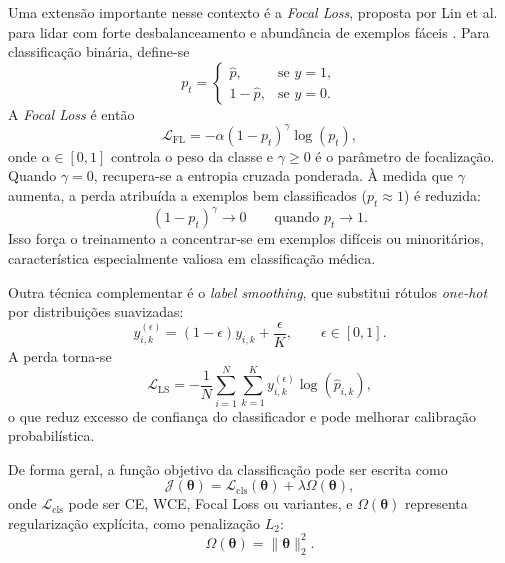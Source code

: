 \documentclass[tcc,capa]{texufpel}
\begin{document}
Uma extensão importante nesse contexto é a \textit{Focal Loss}, proposta por Lin et al. para lidar com forte desbalanceamento e abundância de exemplos fáceis \cite{Lin2017Focal}. Para classificação binária, define-se
\begin{equation}
	p_t =
	\begin{cases}
		\hat{p}, & \text{se } y=1,\\
		1-\hat{p}, & \text{se } y=0.
	\end{cases}
\end{equation}
A \textit{Focal Loss} é então
\begin{equation}
	\mathcal{L}_{\text{FL}}
	=
	-\alpha (1-p_t)^{\gamma}\log(p_t),
\end{equation}
onde \(\alpha \in [0,1]\) controla o peso da classe e \(\gamma \ge 0\) é o parâmetro de focalização. Quando \(\gamma=0\), recupera-se a entropia cruzada ponderada. À medida que \(\gamma\) aumenta, a perda atribuída a exemplos bem classificados (\(p_t \approx 1\)) é reduzida:
\begin{equation}
	(1-p_t)^{\gamma} \to 0
	\qquad \text{quando } p_t \to 1.
\end{equation}
Isso força o treinamento a concentrar-se em exemplos difíceis ou minoritários, característica especialmente valiosa em classificação médica.

Outra técnica complementar é o \textit{label smoothing}, que substitui rótulos \textit{one-hot} por distribuições suavizadas:
\begin{equation}
	y_{i,k}^{(\epsilon)}
	=
	(1-\epsilon)y_{i,k} + \frac{\epsilon}{K},
	\qquad \epsilon \in [0,1].
\end{equation}
A perda torna-se
\begin{equation}
	\mathcal{L}_{\text{LS}}
	=
	-\frac{1}{N}\sum_{i=1}^{N}\sum_{k=1}^{K}
	y_{i,k}^{(\epsilon)}\log(\hat{p}_{i,k}),
\end{equation}
o que reduz excesso de confiança do classificador e pode melhorar calibração probabilística.

De forma geral, a função objetivo da classificação pode ser escrita como
\begin{equation}
	\mathcal{J}(\boldsymbol{\theta})
	=
	\mathcal{L}_{\text{cls}}(\boldsymbol{\theta})
	+
	\lambda \Omega(\boldsymbol{\theta}),
\end{equation}
onde \(\mathcal{L}_{\text{cls}}\) pode ser CE, WCE, Focal Loss ou variantes, e \(\Omega(\boldsymbol{\theta})\) representa regularização explícita, como penalização \(L_2\):
\begin{equation}
	\Omega(\boldsymbol{\theta}) = \|\boldsymbol{\theta}\|_2^2.
\end{equation}
\end{document}

